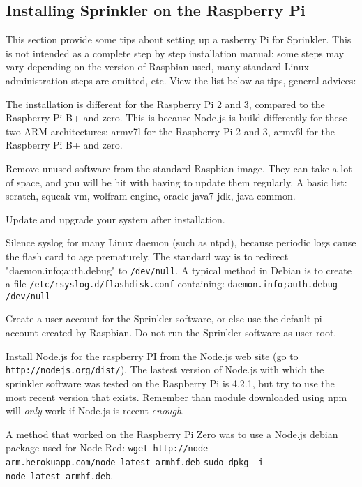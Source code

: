 \documentclass[11pt]{book}
\begin{document}
\subsection{Installing Sprinkler on the Raspberry Pi}
This section provide some tips about setting up a rasberry Pi for Sprinkler. This is not intended as a complete step by step installation manual: some steps may vary depending on the version of Raspbian used, many standard Linux administration steps are omitted, etc. View the list below as tips, general advices:
\begin{description}
\item The installation is different for the Raspberry Pi 2 and 3, compared to the Raspberry Pi B+ and zero. This is because Node.js is build differently for these two ARM architectures: armv7l for the Raspberry Pi 2 and 3, armv6l for the Raspberry Pi B+ and zero.
\item Remove unused software from the standard Raspbian image. They can take a lot of space, and you will be hit with having to update them regularly. A basic list: scratch, squeak-vm, wolfram-engine, oracle-java7-jdk, java-common.
\item Update and upgrade your system after installation.
\item Silence syslog for many Linux daemon (such as ntpd), because periodic logs cause the flash card to age prematurely. The standard way is to redirect "daemon.info;auth.debug" to \texttt{/dev/null}. A typical method in Debian is to create a file \texttt{/etc/rsyslog.d/flashdisk.conf} containing:
\linebreak
\linebreak
\indent\texttt{daemon.info;auth.debug      /dev/null}
\item Create a user account for the Sprinkler software, or else use the default pi account created by Raspbian. Do not run the Sprinkler software as user root.
\item Install Node.js for the raspberry PI from the Node.js web site (go to \texttt{http://nodejs.org/dist/}). The lastest version of Node.js with which the sprinkler software was tested on the Raspberry Pi is 4.2.1, but try to use the most recent version that exists. Remember than module downloaded using npm will \emph{only} work if Node.js is recent \emph{enough}.

\item A method that worked on the Raspberry Pi Zero was to use a Node.js debian package used for Node-Red:
\linebreak
\indent\texttt{wget http://node-arm.herokuapp.com/node\_latest\_armhf.deb}
\linebreak
\indent\texttt{sudo dpkg -i node\_latest\_armhf.deb}.
\end{description}
\end{document}
